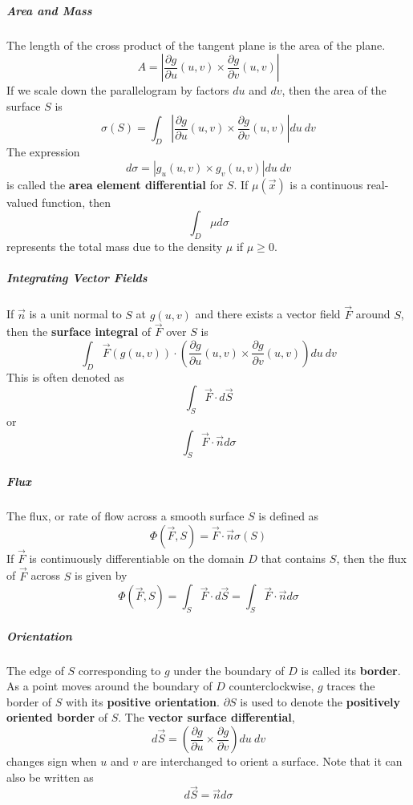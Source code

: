 \documentclass[11pt]{article}
\begin{document}
	\subparagraph{Area and Mass} The length of the cross product of the tangent plane is the area of the plane.
		\begin{equation}
			A = \left| \frac{\partial g}{\partial u}(u, v) \times \frac{\partial g}{\partial v}(u, v) \right|
		\end{equation}
		If we scale down the parallelogram by factors $du$ and $dv$, then the area of the surface $S$ is
		\begin{equation}
			\sigma (S) = \int_D \left| \frac{\partial g}{\partial u}(u, v) \times \frac{\partial g}{\partial v}(u, v) \right| du\ dv
		\end{equation}
		The expression
		\begin{equation}
			d\sigma = |g_u (u, v) \times g_v (u, v)| du\ dv
		\end{equation}
		is called the \textbf{area element differential} for $S$. If $\mu (\vec{x})$ is a continuous real-valued function, then
		\begin{equation}
			\int_D \mu d\sigma
		\end{equation}
		represents the total mass due to the density $\mu$ if $\mu \geq 0$.
		
	\subparagraph{Integrating Vector Fields} If $\vec{n}$ is a unit normal to $S$ at $g(u, v)$ and there exists a vector field $\vec{F}$ around $S$, then the \textbf{surface integral} of $\vec{F}$ over $S$ is
		\begin{equation}
			\int_D \vec{F}(g(u, v)) \cdot \left( \frac{\partial g}{\partial u}(u, v) \times \frac{\partial g}{\partial v}(u, v) \right) du\ dv
		\end{equation}
		This is often denoted as \[\int_S \vec{F} \cdot d\vec{S}\] or \[\int_S \vec{F} \cdot \vec{n} d\sigma\]
		
	\subparagraph{Flux} The flux, or rate of flow across a smooth surface $S$ is defined as
		\begin{equation}
			\Phi (\vec{F}, S) = \vec{F} \cdot \vec{n} \sigma(S)
		\end{equation}
		If $\vec{F}$ is continuously differentiable on the domain $D$ that contains $S$, then the flux of $\vec{F}$ across $S$ is given by
		\begin{equation}
			\Phi (\vec{F}, S) = \int_S \vec{F} \cdot d\vec{S} = \int_S \vec{F} \cdot \vec{n} d\sigma
		\end{equation}
		
	\subparagraph{Orientation} The edge of $S$ corresponding to $g$ under the boundary of $D$ is called its \textbf{border}. As a point moves around the boundary of $D$ counterclockwise, $g$ traces the border of $S$ with its \textbf{positive orientation}. $\partial S$ is used to denote the \textbf{positively oriented border} of $S$. The \textbf{vector surface differential},
		\begin{equation}
			d\vec{S} = \left( \frac{\partial g}{\partial u} \times \frac{\partial g}{\partial v} \right) du\ dv
		\end{equation}
		changes sign when $u$ and $v$ are interchanged to orient a surface. Note that it can also be written as
		\begin{equation}
			d\vec{S} = \vec{n} d\sigma
		\end{equation}
		
\end{document}
